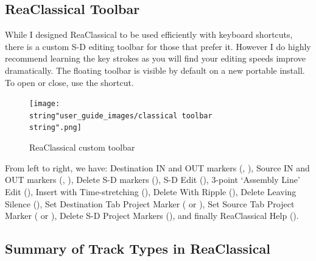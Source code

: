 \documentclass[10pt,american]{article}
\begin{document}
\subsection{ReaClassical Toolbar}

While I designed ReaClassical to be used efficiently with keyboard shortcuts,
there is a custom S-D editing toolbar for those that prefer it. However I do
highly recommend learning the key strokes as you will find your editing speeds
improve dramatically. The floating toolbar is visible by default on a new
portable install. To open or close, use the  shortcut.
\begin{flushleft}
\begin{figure}[H]
\begin{centering}
\texttt{[image: \\string"user\_guide\_images/classical toolbar\\string".png]}
\par\end{centering} \caption{\label{classical-toolbar-1}ReaClassical custom
toolbar}
\end{figure}
\par\end{flushleft}

From left to right, we have: Destination IN and OUT markers (,
), Source IN and OUT markers (, ), Delete S-D markers
(\keys{\ctrl+\del}), S-D Edit (), 3-point `Assembly Line' Edit
(), Insert with Time-stretching (), Delete With Ripple
(\keys{\backspace}), Delete Leaving Silence (\keys{\ctrl+\backspace}), Set
Destination Tab Project Marker ( or ), Set
Source Tab Project Marker ( or ), Delete S-D
Project Markers (), and finally ReaClassical Help ().

\subsection{Summary of Track Types in ReaClassical}
\end{document}
